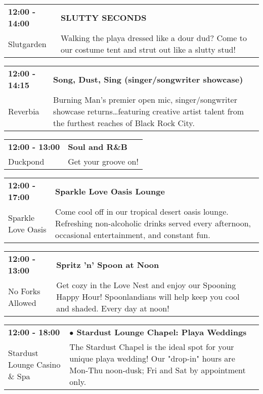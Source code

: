 \begin{tabular}{ p{1in} p{2.2in} }
    \textbf{12:00 - 14:00} & \textbf{SLUTTY SECONDS} \\
    Slutgarden \newline  & Walking the playa dressed like a dour dud? Come to our costume tent and strut out like a slutty stud! \\
    \hline 
\end{tabular}
    
\begin{tabular}{ p{1in} p{2.2in} }
    \textbf{12:00 - 14:15} & \textbf{Song, Dust, Sing (singer/songwriter showcase)} \\
    Reverbia \newline  & Burning Man's premier open mic, singer/songwriter showcase returns\ldots featuring creative artist talent from the furthest reaches of Black Rock City. \\
    \hline 
\end{tabular}
    
\begin{tabular}{ p{1in} p{2.2in} }
    \textbf{12:00 - 13:00} & \textbf{Soul and R\&B} \\
    Duckpond \newline  & Get your groove on! \\
    \hline 
\end{tabular}
    
\begin{tabular}{ p{1in} p{2.2in} }
    \textbf{12:00 - 17:00} & \textbf{Sparkle Love Oasis Lounge} \\
    Sparkle Love Oasis \newline  & Come cool off in our tropical desert oasis lounge. Refreshing non-alcoholic drinks served every afternoon, occasional entertainment, and constant fun. \\
    \hline 
\end{tabular}
    
\begin{tabular}{ p{1in} p{2.2in} }
    \textbf{12:00 - 13:00} & \textbf{Spritz 'n' Spoon at Noon} \\
    No Forks Allowed \newline  & Get cozy in the Love Nest and enjoy our Spooning Happy Hour! Spoonlandians will help keep you cool and shaded. Every day at noon! \\
    \hline 
\end{tabular}
    
\begin{tabular}{ p{1in} p{2.2in} }
    \textbf{12:00 - 18:00} & \textbf{$\bullet$	Stardust Lounge Chapel: Playa Weddings} \\
    Stardust Lounge Casino \& Spa \newline  & The Stardust Chapel is the ideal spot for your unique playa wedding! Our "drop-in" hours are Mon-Thu noon-dusk; Fri and Sat by appointment only. \\
    \hline 
\end{tabular}
    
